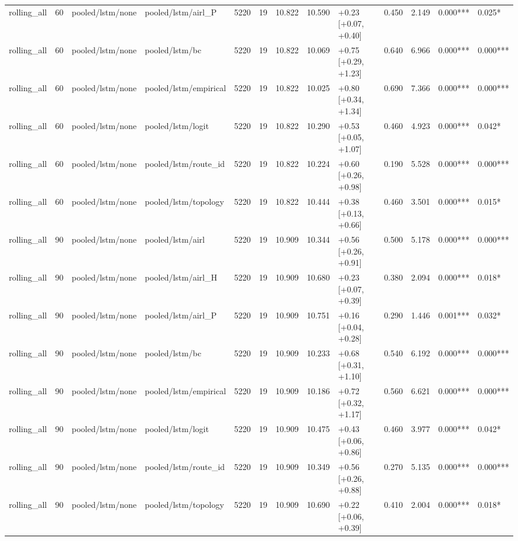 \begin{tabular}{lrllrrrrlrrll}
rolling_all & 60 & pooled/lstm/none & pooled/lstm/airl_P & 5220 & 19 & 10.822 & 10.590 & +0.23 [+0.07, +0.40] & 0.450 & 2.149 & 0.000*** & 0.025* \\
rolling_all & 60 & pooled/lstm/none & pooled/lstm/bc & 5220 & 19 & 10.822 & 10.069 & +0.75 [+0.29, +1.23] & 0.640 & 6.966 & 0.000*** & 0.000*** \\
rolling_all & 60 & pooled/lstm/none & pooled/lstm/empirical & 5220 & 19 & 10.822 & 10.025 & +0.80 [+0.34, +1.34] & 0.690 & 7.366 & 0.000*** & 0.000*** \\
rolling_all & 60 & pooled/lstm/none & pooled/lstm/logit & 5220 & 19 & 10.822 & 10.290 & +0.53 [+0.05, +1.07] & 0.460 & 4.923 & 0.000*** & 0.042* \\
rolling_all & 60 & pooled/lstm/none & pooled/lstm/route_id & 5220 & 19 & 10.822 & 10.224 & +0.60 [+0.26, +0.98] & 0.190 & 5.528 & 0.000*** & 0.000*** \\
rolling_all & 60 & pooled/lstm/none & pooled/lstm/topology & 5220 & 19 & 10.822 & 10.444 & +0.38 [+0.13, +0.66] & 0.460 & 3.501 & 0.000*** & 0.015* \\
rolling_all & 90 & pooled/lstm/none & pooled/lstm/airl & 5220 & 19 & 10.909 & 10.344 & +0.56 [+0.26, +0.91] & 0.500 & 5.178 & 0.000*** & 0.000*** \\
rolling_all & 90 & pooled/lstm/none & pooled/lstm/airl_H & 5220 & 19 & 10.909 & 10.680 & +0.23 [+0.07, +0.39] & 0.380 & 2.094 & 0.000*** & 0.018* \\
rolling_all & 90 & pooled/lstm/none & pooled/lstm/airl_P & 5220 & 19 & 10.909 & 10.751 & +0.16 [+0.04, +0.28] & 0.290 & 1.446 & 0.001*** & 0.032* \\
rolling_all & 90 & pooled/lstm/none & pooled/lstm/bc & 5220 & 19 & 10.909 & 10.233 & +0.68 [+0.31, +1.10] & 0.540 & 6.192 & 0.000*** & 0.000*** \\
rolling_all & 90 & pooled/lstm/none & pooled/lstm/empirical & 5220 & 19 & 10.909 & 10.186 & +0.72 [+0.32, +1.17] & 0.560 & 6.621 & 0.000*** & 0.000*** \\
rolling_all & 90 & pooled/lstm/none & pooled/lstm/logit & 5220 & 19 & 10.909 & 10.475 & +0.43 [+0.06, +0.86] & 0.460 & 3.977 & 0.000*** & 0.042* \\
rolling_all & 90 & pooled/lstm/none & pooled/lstm/route_id & 5220 & 19 & 10.909 & 10.349 & +0.56 [+0.26, +0.88] & 0.270 & 5.135 & 0.000*** & 0.000*** \\
rolling_all & 90 & pooled/lstm/none & pooled/lstm/topology & 5220 & 19 & 10.909 & 10.690 & +0.22 [+0.06, +0.39] & 0.410 & 2.004 & 0.000*** & 0.018* \\

\end{tabular}

